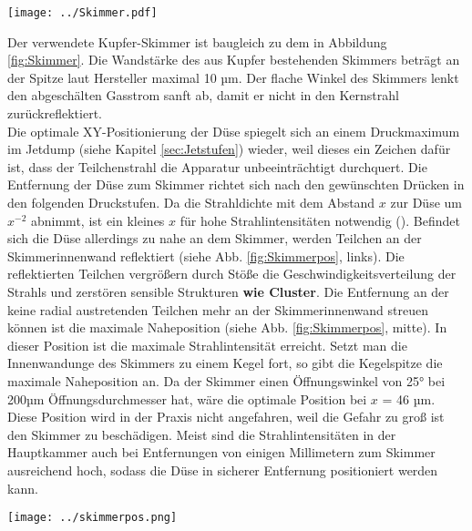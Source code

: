 \begin{center}
\begin{minipage}{\linewidth}
\centering
\texttt{[image: ../Skimmer.pdf]}%
 \label{fig:Skimmer}
\end{minipage} 
\end{center} 
Der verwendete Kupfer-Skimmer ist baugleich zu dem in Abbildung \ref{fig:Skimmer}. Die Wandstärke des aus Kupfer bestehenden Skimmers beträgt an der Spitze laut Hersteller maximal 10 µm. Der flache Winkel des Skimmers lenkt den abgeschälten Gasstrom sanft ab, damit er nicht in den Kernstrahl zurückreflektiert.\\
Die optimale XY-Positionierung der Düse spiegelt sich an einem Druckmaximum im Jetdump (siehe Kapitel \ref{sec:Jetstufen}) wieder, weil dieses ein Zeichen dafür ist, dass der Teilchenstrahl die Apparatur unbeeinträchtigt durchquert. Die Entfernung der Düse zum Skimmer richtet sich nach den gewünschten Drücken in den folgenden Druckstufen. Da die Strahldichte mit dem Abstand $x$ zur Düse um $x^{-2}$ abnimmt, ist ein kleines $x$ für hohe Strahlintensitäten notwendig  (\cite{hagena1981nucleation}). Befindet sich die Düse allerdings zu nahe an dem Skimmer, werden Teilchen an der Skimmerinnenwand reflektiert (siehe Abb. \ref{fig:Skimmerpos}, links). Die reflektierten Teilchen vergrößern durch Stöße die Geschwindigkeitsverteilung der Strahls und zerstören sensible Strukturen \textbf{wie Cluster}. Die Entfernung an der keine radial austretenden Teilchen mehr an der Skimmerinnenwand streuen können ist die maximale Naheposition (siehe Abb. \ref{fig:Skimmerpos}, mitte). In dieser Position ist die maximale Strahlintensität erreicht. Setzt man die Innenwandunge des Skimmers zu einem Kegel fort, so gibt die Kegelspitze die maximale Naheposition an. Da der Skimmer einen Öffnungswinkel von 25° bei 200µm Öffnungsdurchmesser hat, wäre die optimale Position bei $x$ = 46 µm. Diese Position wird in der Praxis nicht angefahren, weil die Gefahr zu groß ist den Skimmer zu beschädigen. 
Meist sind die Strahlintensitäten in der Hauptkammer auch bei Entfernungen von einigen Millimetern zum Skimmer ausreichend hoch, sodass die Düse in sicherer Entfernung positioniert werden kann.  
 
\begin{center}
\begin{minipage}{\linewidth}
\centering
\texttt{[image: ../skimmerpos.png]}%
 \label{fig:Skimmerpos}
\end{minipage} 
\end{center} 

